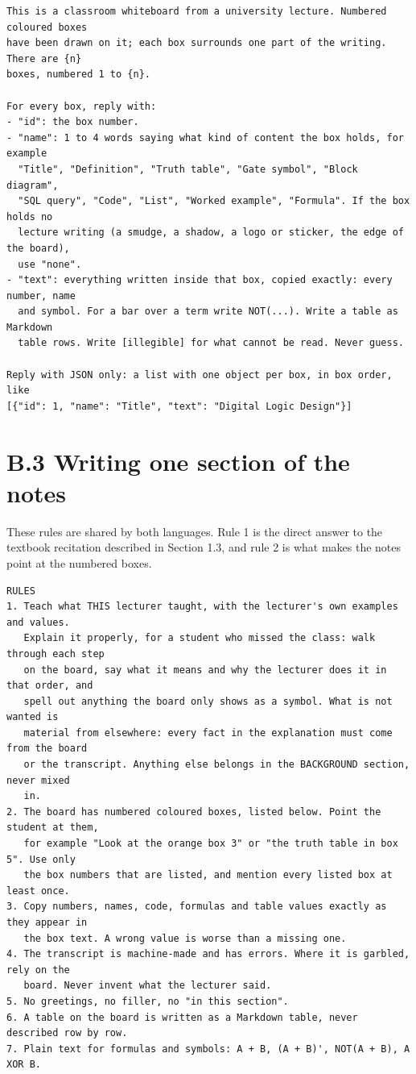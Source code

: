\begingroup\footnotesize
\begin{verbatim}
This is a classroom whiteboard from a university lecture. Numbered coloured boxes
have been drawn on it; each box surrounds one part of the writing. There are {n}
boxes, numbered 1 to {n}.

For every box, reply with:
- "id": the box number.
- "name": 1 to 4 words saying what kind of content the box holds, for example
  "Title", "Definition", "Truth table", "Gate symbol", "Block diagram",
  "SQL query", "Code", "List", "Worked example", "Formula". If the box holds no
  lecture writing (a smudge, a shadow, a logo or sticker, the edge of the board),
  use "none".
- "text": everything written inside that box, copied exactly: every number, name
  and symbol. For a bar over a term write NOT(...). Write a table as Markdown
  table rows. Write [illegible] for what cannot be read. Never guess.

Reply with JSON only: a list with one object per box, in box order, like
[{"id": 1, "name": "Title", "text": "Digital Logic Design"}]
\end{verbatim}
\endgroup

\section*{B.3 Writing one section of the notes}

These rules are shared by both languages. Rule 1 is the direct answer to the textbook
recitation described in Section 1.3, and rule 2 is what makes the notes point at the
numbered boxes.

\begingroup\footnotesize
\begin{verbatim}
RULES
1. Teach what THIS lecturer taught, with the lecturer's own examples and values.
   Explain it properly, for a student who missed the class: walk through each step
   on the board, say what it means and why the lecturer does it in that order, and
   spell out anything the board only shows as a symbol. What is not wanted is
   material from elsewhere: every fact in the explanation must come from the board
   or the transcript. Anything else belongs in the BACKGROUND section, never mixed
   in.
2. The board has numbered coloured boxes, listed below. Point the student at them,
   for example "Look at the orange box 3" or "the truth table in box 5". Use only
   the box numbers that are listed, and mention every listed box at least once.
3. Copy numbers, names, code, formulas and table values exactly as they appear in
   the box text. A wrong value is worse than a missing one.
4. The transcript is machine-made and has errors. Where it is garbled, rely on the
   board. Never invent what the lecturer said.
5. No greetings, no filler, no "in this section".
6. A table on the board is written as a Markdown table, never described row by row.
7. Plain text for formulas and symbols: A + B, (A + B)', NOT(A + B), A XOR B.
\end{verbatim}
\endgroup

